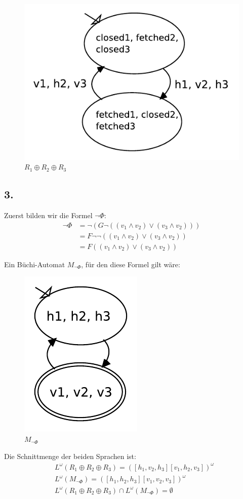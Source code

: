 \documentclass[12pt, paper=a4]{article}
\begin{document}
\begin{figure}[h!]
\centering
\includegraphics[scale=0.7]{r1r2r3_prod.pdf}
\caption{$R_1 \oplus R_2 \oplus R_3$}
\end{figure}

\subsection*{3.}
Zuerst bilden wir die Formel $\neg \Phi$:
\begin{align*}
\neg \Phi &= \neg (G \neg ((v_1 \wedge v_2) \vee (v_3 \wedge v_2)))\\
&= F \neg \neg ((v_1 \wedge v_2) \vee (v_3 \wedge v_2))\\
&= F ((v_1 \wedge v_2) \vee (v_3 \wedge v_2))
\end{align*}

Ein Büchi-Automat $M_{\neg\Phi}$, für den diese Formel gilt wäre:\\

\begin{figure}[h!]
\centering
\includegraphics[scale=0.8]{notphibuechi.pdf}
\caption{$M_{\neg\Phi}$}
\end{figure}

Die Schnittmenge der beiden Sprachen ist:\\
\begin{align*}
&L^\omega(R_1 \oplus R_2 \oplus R_3) = ([h_1, v_2, h_3] [v_1, h_2, v_3])^\omega\\
&L^\omega(M_{\neg\Phi}) = ([h_1, h_2, h_3] [v_1, v_2, v_3])^\omega\\
&L^\omega(R_1 \oplus R_2 \oplus R_3) \cap L^\omega(M_{\neg\Phi}) = \emptyset
\end{align*}
\end{document}
